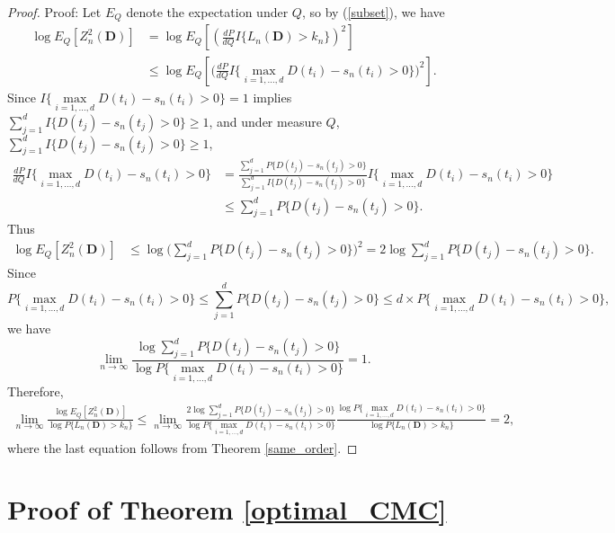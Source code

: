 \documentclass[final,11pt,3p]{article}\usepackage{setspace}
\begin{document}
\begin{proof}{Proof:}
Let $E_Q$ denote the expectation under $Q$, so by (\ref{subset}), we have
\begin{align*}
\log E_{{Q}} [Z_n^2(\boldsymbol{D})] &= \log E_{{Q}} [ (\frac{d{P} }{d {Q} } I\{L_n(\boldsymbol{D}) > k_n\} )^2]\\
&\le   \log E_{{Q}} [ \big(\frac{d{P} }{d {Q} }  I\{ \max\limits_{i=1,\dots,d} D(t_i)-s_n(t_i) > 0\} \big)^2].
\end{align*}
Since $I\{ \max\limits_{i=1,\dots,d} D(t_i)-s_n(t_i) > 0\} = 1$ implies $\sum_{j=1}^d I\{D(t_j) - s_n(t_j) > 0 \} \ge 1$, and under measure $Q$, $\sum_{j=1}^d I\{D(t_j) - s_n(t_j) > 0 \} \ge 1$,
\begin{align*}
\frac{d{P} }{d {Q} }  I\{ \max\limits_{i=1,\dots,d} D(t_i)-s_n(t_i) > 0\} &= \frac{\sum_{j=1}^d P\{D(t_j) - s_n(t_j) > 0\}}{\sum_{j=1}^d I\{D(t_j) - s_n(t_j) > 0 \} } I\{ \max\limits_{i=1,\dots,d} D(t_i)-s_n(t_i) > 0\} \\
& \le \sum_{j=1}^d P\{D(t_j) - s_n(t_j) > 0\}.
\end{align*}
Thus
\begin{align*}
\log E_{{Q}} [Z_n^2(\boldsymbol{D})]  &\le  \log  \big(\sum_{j=1}^dP\{D(t_j) - s_n(t_j) > 0\}\big)^2 = 2 \log \sum_{j=1}^dP\{D(t_j) - s_n(t_j) > 0\}.
\end{align*}
Since
\begin{equation*}
P\{\max\limits_{i=1,\dots,d} D(t_i)-{s_n}(t_i) > 0\} \le \sum_{j=1}^dP\{D(t_j) - s_n(t_j) > 0\} \le d \times P\{\max\limits_{i=1,\dots,d} D(t_i)-{s_n}(t_i) > 0\},
\end{equation*}
we have
\begin{equation*}
\lim_{n\rightarrow \infty}\frac{\log \sum_{j=1}^dP\{D(t_j) - s_n(t_j) > 0\}}{\log P\{\max\limits_{i=1,\dots,d} D(t_i)-{s_n}(t_i) > 0\}} = 1.
\end{equation*}
Therefore,
\begin{align*}
\lim_{n\rightarrow \infty}\frac{ \log E_{{Q}} [Z_n^2(\boldsymbol{D})]}{\log {P} \{L_n(\boldsymbol{D}) > k_n\} }
\le \lim_{n\rightarrow \infty} \frac{2 \log \sum_{j=1}^dP\{D(t_j) - s_n(t_j) > 0\}}{\log P\{\max\limits_{i=1,\dots,d} D(t_i)-{s_n}(t_i) > 0\}}  \frac{\log P\{\max\limits_{i=1,\dots,d} D(t_i)-{s_n}(t_i) > 0\}}{\log {P} \{L_n(\boldsymbol{D}) > k_n\}}
= 2,
\end{align*}
where the last equation follows from Theorem \ref{same_order}. {}
\end{proof}

\section{Proof of Theorem \ref{optimal_CMC} } \label{appendix: optimal_CMC}
\end{document}
